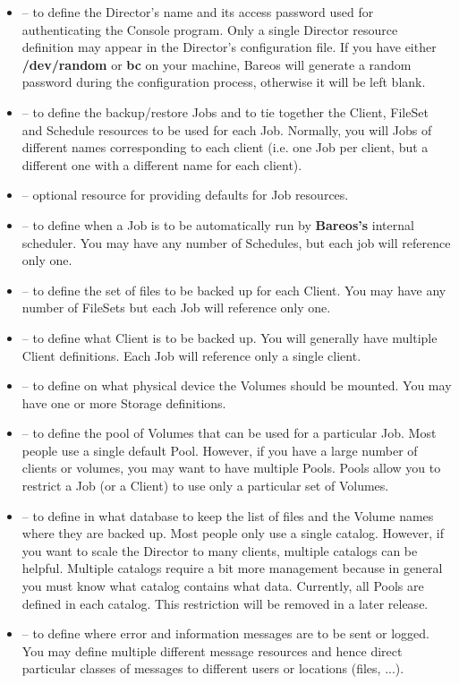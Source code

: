 \begin{itemize}
\item
    -- to  define the Director's
   name and its access password used for authenticating the Console program.
   Only a single  Director resource definition may appear in the Director's
   configuration file.  If you have either {\bf /dev/random} or  {\bf bc} on your
   machine, Bareos will generate a random password during the configuration
   process, otherwise it will  be left blank.
\item
    -- to define the backup/restore Jobs
   and to tie together the Client, FileSet and Schedule resources to  be used
   for each Job. Normally, you will Jobs of different names corresponding
   to each client (i.e. one Job per client, but a different one with a different name
   for each client).
\item
    -- optional resource for
   providing defaults for Job resources.
\item
    -- to define when a Job is to
   be automatically run by {\bf Bareos's} internal scheduler. You
   may have any number of Schedules, but each job will reference only
   one.
\item
    -- to define the set of files
   to be backed up for each Client. You may have any number of
   FileSets but each Job will reference only one.
\item
    -- to define what Client is to be
   backed up. You will generally have multiple Client definitions. Each
   Job will reference only a single client.
\item
    -- to define on what physical
   device the Volumes should be mounted. You may have one or
   more Storage definitions.
\item
    -- to define the pool of Volumes
   that can be used for a particular Job. Most people use a
   single default Pool.  However, if you have a large number
   of clients or volumes, you may want to have multiple Pools.
   Pools allow you to restrict a Job (or a Client) to use
   only a particular set of Volumes.
\item
    -- to define in what database to
   keep the list of files and the Volume names where they are backed up.
   Most people only use a single catalog.  However, if you want to
   scale the Director to many clients, multiple catalogs can be helpful.
   Multiple catalogs require a bit more management because in general
   you must know what catalog contains what data.  Currently, all
   Pools are defined in each catalog.  This restriction will be removed
   in a later release.
\item
    -- to define where error and
   information messages are to be sent or logged. You may define
   multiple different message resources and hence direct particular
   classes of messages to different users or locations (files, ...).
\end{itemize}

